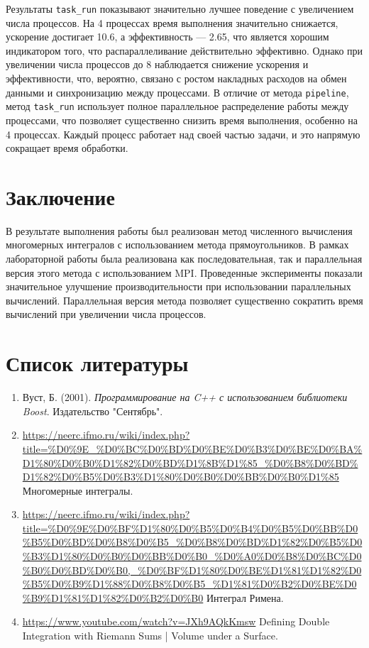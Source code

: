 \documentclass[12pt]{article}
\begin{document}
\noindent Результаты \texttt{task\_run} показывают значительно лучшее поведение с увеличением числа процессов. На 4 процессах время выполнения значительно снижается, ускорение достигает 10.6, а эффективность — 2.65, что является хорошим индикатором того, что распараллеливание действительно эффективно. Однако при увеличении числа процессов до 8 наблюдается снижение ускорения и эффективности, что, вероятно, связано с ростом накладных расходов на обмен данными и синхронизацию между процессами. В отличие от метода \texttt{pipeline}, метод \texttt{task\_run} использует полное параллельное распределение работы между процессами, что позволяет существенно снизить время выполнения, особенно на 4 процессах. Каждый процесс работает над своей частью задачи, и это напрямую сокращает время обработки. 

\section*{Заключение}

В результате выполнения работы был реализован метод численного вычисления многомерных интегралов с использованием метода прямоугольников. В рамках лабораторной работы была реализована как последовательная, так и параллельная версия этого метода с использованием MPI. Проведенные эксперименты показали значительное улучшение производительности при использовании параллельных вычислений. Параллельная версия метода позволяет существенно сократить время вычислений при увеличении числа процессов.

\newpage
\section*{Список литературы}
\begin{enumerate}
\item Вуст, Б. (2001). \textit{Программирование на C++ с использованием библиотеки Boost}. Издательство "Сентябрь".
\item \url{https://neerc.ifmo.ru/wiki/index.php?title=%D0%9E_%D0%BC%D0%BD%D0%BE%D0%B3%D0%BE%D0%BA%D1%80%D0%B0%D1%82%D0%BD%D1%8B%D1%85_%D0%B8%D0%BD%D1%82%D0%B5%D0%B3%D1%80%D0%B0%D0%BB%D0%B0%D1%85}{ Многомерные интегралы}.
\item \url{https://neerc.ifmo.ru/wiki/index.php?title=%D0%9E%D0%BF%D1%80%D0%B5%D0%B4%D0%B5%D0%BB%D0%B5%D0%BD%D0%B8%D0%B5_%D0%B8%D0%BD%D1%82%D0%B5%D0%B3%D1%80%D0%B0%D0%BB%D0%B0_%D0%A0%D0%B8%D0%BC%D0%B0%D0%BD%D0%B0,_%D0%BF%D1%80%D0%BE%D1%81%D1%82%D0%B5%D0%B9%D1%88%D0%B8%D0%B5_%D1%81%D0%B2%D0%BE%D0%B9%D1%81%D1%82%D0%B2%D0%B0}{ Интеграл Римена}.
\item \url{https://www.youtube.com/watch?v=JXh9AQkKmsw}{ Defining Double Integration with Riemann Sums | Volume under a Surface}.
\end{enumerate}
\end{document}

